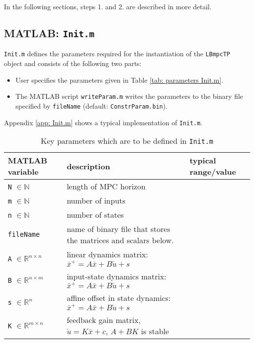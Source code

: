 \documentclass[letter]{article}
\begin{document}
\begin{sffamily}
\noindent
In the following sections, steps 1. and 2. are described in more detail.

\subsection{MATLAB: \texttt{Init.m}}
\texttt{Init.m} defines the parameters required for the instantiation of the \texttt{LBmpcTP} object and consists of the following two parts:
\begin{itemize}
	\item User specifies the parameters given in Table \ref{tab: parameters Init.m}.
	\item The MATLAB script \texttt{writeParam.m} writes the parameters to the binary file specified by \texttt{fileName} (default: \texttt{ConstrParam.bin}).
\end{itemize}
Appendix \ref{app: Init.m} shows a typical implementation of \texttt{Init.m}. \\

\begin{table}[!htdp]
\caption{Key parameters which are to be defined in \texttt{Init.m}}
\begin{center}
\begin{tabular}{|l|l|l|}\hline
{\bf MATLAB variable} & description & typical range/value \\ \hline\hline

 \texttt{N} $\in\mathbb{N}$ & length of MPC horizon & \\ 
 \texttt{m} $\in\mathbb{N}$ & number of inputs & \\ 
 \texttt{n} $\in\mathbb{N}$ & number of states & \\  \hline
 
 \texttt{fileName} & name of binary file that stores the matrices and scalars below. & \\  \hline
 
 \texttt{A} $\in\mathbb{R}^{n\times n}$ & linear dynamics matrix: $\bar{x}^+ = A\bar{x}+B\check{u}+s$ & \\ 
 \texttt{B} $\in\mathbb{R}^{n\times m}$ & input-state dynamics matrix: $\bar{x}^+ = A\bar{x}+B\check{u}+s$ & \\ 
 \texttt{s} $\in\mathbb{R}^{n}$ & affine offset in state dynamics:  $\bar{x}^+ = A\bar{x}+B\check{u}+s$ & \\ 
 \texttt{K} $\in\mathbb{R}^{m\times n}$  & feedback gain matrix, $\check{u}=K\bar{x}+c$, $A+BK$ is stable & \\  \hline
  

\end{tabular}
\end{center}
\end{table}
\end{sffamily}
\end{document}
